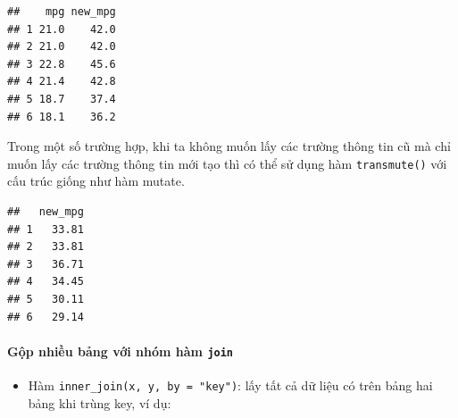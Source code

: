 \documentclass[]{krantz}
\makeatletter
\newenvironment{Shaded}{\begin{snugshade}}{\end{snugshade}}
\newcommand{\DataTypeTok}[1]{\textcolor[rgb]{0.27,0.27,0.27}{#1}}
\newcommand{\FloatTok}[1]{\textcolor[rgb]{0.06,0.06,0.06}{#1}}
\newcommand{\KeywordTok}[1]{\textcolor[rgb]{0.27,0.27,0.27}{\textbf{#1}}}
\newcommand{\NormalTok}[1]{#1}
\newcommand{\OperatorTok}[1]{\textcolor[rgb]{0.43,0.43,0.43}{\textbf{#1}}}
\newcommand{\StringTok}[1]{\textcolor[rgb]{0.5,0.5,0.5}{#1}}
\providecommand{\tightlist}{%
  \setlength{\itemsep}{0pt}\setlength{\parskip}{0pt}}
\let\oldparagraph\paragraph
\renewcommand{\paragraph}[1]{\oldparagraph{#1}\mbox{}}
\newenvironment{kframe}{%
\medskip{}
\setlength{\fboxsep}{.8em}
 \def\at@end@of@kframe{}%
 \ifinner\ifhmode%
  \def\at@end@of@kframe{\end{minipage}}%
  \begin{minipage}{\columnwidth}%
 \fi\fi%
 \def\FrameCommand##1{\hskip\@totalleftmargin \hskip-\fboxsep
 \colorbox{shadecolor}{##1}\hskip-\fboxsep
     \hskip-\linewidth \hskip-\@totalleftmargin \hskip\columnwidth}%
 \MakeFramed {\advance\hsize-\width
   \@totalleftmargin\z@ \linewidth\hsize
   \@setminipage}}%
 {\par\unskip\endMakeFramed%
 \at@end@of@kframe}
\renewenvironment{Shaded}{\begin{kframe}}{\end{kframe}}
\renewenvironment{Shaded}{\begin{snugshade}}{\end{snugshade}}
\renewcommand{\DataTypeTok}[1]{\textcolor[rgb]{0.13,0.29,0.53}{#1}}
\renewcommand{\FloatTok}[1]{\textcolor[rgb]{0.00,0.00,0.81}{#1}}
\renewcommand{\KeywordTok}[1]{\textcolor[rgb]{0.13,0.29,0.53}{\textbf{#1}}}
\renewcommand{\NormalTok}[1]{#1}
\renewcommand{\OperatorTok}[1]{\textcolor[rgb]{0.81,0.36,0.00}{\textbf{#1}}}
\renewcommand{\StringTok}[1]{\textcolor[rgb]{0.31,0.60,0.02}{#1}}
\theoremstyle{definition}
\theoremstyle{definition}
\theoremstyle{definition}
\theoremstyle{remark}
\makeatother
\begin{document}
\begin{verbatim}
##    mpg new_mpg
## 1 21.0    42.0
## 2 21.0    42.0
## 3 22.8    45.6
## 4 21.4    42.8
## 5 18.7    37.4
## 6 18.1    36.2
\end{verbatim}

Trong một số trường hợp, khi ta không muốn lấy các trường thông tin cũ
mà chỉ muốn lấy các trường thông tin mới tạo thì có thể sử dụng hàm
\texttt{transmute()} với cấu trúc giống như hàm mutate.

\begin{Shaded}
\end{Shaded}

\begin{verbatim}
##   new_mpg
## 1   33.81
## 2   33.81
## 3   36.71
## 4   34.45
## 5   30.11
## 6   29.14
\end{verbatim}

\hypertarget{gp-nhiu-bang-vi-nhom-ham-join}{%
\paragraph{\texorpdfstring{Gộp nhiều bảng với nhóm hàm
\texttt{join}}{Gộp nhiều bảng với nhóm hàm join}}\label{gp-nhiu-bang-vi-nhom-ham-join}}

\begin{itemize}
\tightlist
\item
  Hàm \texttt{inner\_join(x,\ y,\ by\ =\ "key")}: lấy tất cả dữ liệu có
  trên bảng hai bảng khi trùng key, ví dụ:
\end{itemize}
\end{document}
